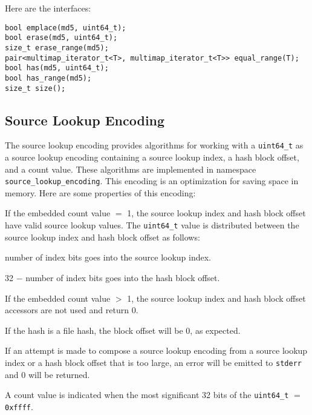 \documentclass[12pt,twoside]{article}
\begin{document}
Here are the interfaces:
\begin{small}
\begin{verbatim}
bool emplace(md5, uint64_t);
bool erase(md5, uint64_t);
size_t erase_range(md5);
pair<multimap_iterator_t<T>, multimap_iterator_t<T>> equal_range(T);
bool has(md5, uint64_t);
bool has_range(md5);
size_t size();
\end{verbatim}
\end{small}

\subsection{Source Lookup Encoding}
The source lookup encoding provides algorithms for working with a
\texttt{uint64\_t}
as a source lookup encoding containing a source lookup index,
a hash block offset, and a count value.
These algorithms are
implemented in namespace \texttt{source\_lookup\_encoding}.
This encoding is an optimization for saving space in memory.
Here are some properties of this encoding:
\begin{compactitem}
\item If the embedded count value $=$ 1,
the source lookup index and hash block offset
have valid source lookup values.
The \texttt{uint64\_t} value is distributed between the
source lookup index and hash block offset as follows:
  \begin{compactitem}
  \item number of index bits goes into the source lookup index.
  \item 32 $-$ number of index bits goes into the hash block offset.
  \end{compactitem}
\item If the embedded count value $>$ 1,
the source lookup index and hash block offset accessors
are not used and return 0.
\item If the hash is a file hash, the block offset will be 0, as expected.
\item If an attempt is made to compose a source lookup encoding
from a source lookup index or a hash block offset
that is too large, an error will be emitted to \texttt{stderr}
and 0 will be returned.
\item A count value is indicated when the most significant 32 bits
of the \texttt{uint64\_t} $=$ \texttt{0xffff}.
\end{compactitem}

\end{document}
